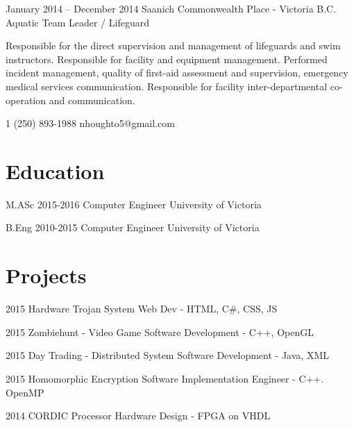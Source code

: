 \documentclass{tccv}
\begin{document}
\begin{eventlist}
\item{January 2014 – December 2014}
     {Saanich Commonwealth Place - Victoria B.C.}
     {Aquatic Team Leader / Lifeguard}

Responsible for the direct supervision and management of lifeguards and swim instructors. Responsible for facility and equipment management. Performed incident management, quality of first-aid assessment and supervision, emergency medical services communication. Responsible for facility inter-departmental co-operation and communication.


\end{eventlist}

    {1 (250) 893-1988}
    {nhoughto5@gmail.com}

\section{Education}

\begin{yearlist}

\item[M.ASc]{2015-2016}
	{Computer Engineer}
	{University of Victoria}
\item[B.Eng]{2010-2015}
     {Computer Engineer}
     {University of Victoria}

\end{yearlist}

\section{Projects}

\begin{yearlist}

\item{2015}
    {Hardware Trojan System}
	{Web Dev - HTML, C\#, CSS, JS}

\item{2015}
     {Zombiehunt - Video Game}
     {Software Development - C++, OpenGL}

\item{2015}
     {Day Trading - Distributed System}
     {Software Development - Java, XML}

\item{2015}
     {Homomorphic Encryption}
     {Software Implementation Engineer - C++. OpenMP}

\item{2014}
     {CORDIC Processor}
     {Hardware Design - FPGA on VHDL}

\end{yearlist}
\end{document}
